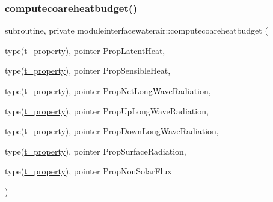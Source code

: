 \subsubsection{\texorpdfstring{computecoareheatbudget()}{computecoareheatbudget()}}
{\footnotesize\ttfamily subroutine, private moduleinterfacewaterair\+::computecoareheatbudget (\begin{DoxyParamCaption}\item[{type(\mbox{\hyperlink{structmoduleinterfacewaterair_1_1t__property}{t\+\_\+property}}), pointer}]{Prop\+Latent\+Heat,  }\item[{type(\mbox{\hyperlink{structmoduleinterfacewaterair_1_1t__property}{t\+\_\+property}}), pointer}]{Prop\+Sensible\+Heat,  }\item[{type(\mbox{\hyperlink{structmoduleinterfacewaterair_1_1t__property}{t\+\_\+property}}), pointer}]{Prop\+Net\+Long\+Wave\+Radiation,  }\item[{type(\mbox{\hyperlink{structmoduleinterfacewaterair_1_1t__property}{t\+\_\+property}}), pointer}]{Prop\+Up\+Long\+Wave\+Radiation,  }\item[{type(\mbox{\hyperlink{structmoduleinterfacewaterair_1_1t__property}{t\+\_\+property}}), pointer}]{Prop\+Down\+Long\+Wave\+Radiation,  }\item[{type(\mbox{\hyperlink{structmoduleinterfacewaterair_1_1t__property}{t\+\_\+property}}), pointer}]{Prop\+Surface\+Radiation,  }\item[{type(\mbox{\hyperlink{structmoduleinterfacewaterair_1_1t__property}{t\+\_\+property}}), pointer}]{Prop\+Non\+Solar\+Flux }\end{DoxyParamCaption})\hspace{0.3cm}{\ttfamily [private]}}

